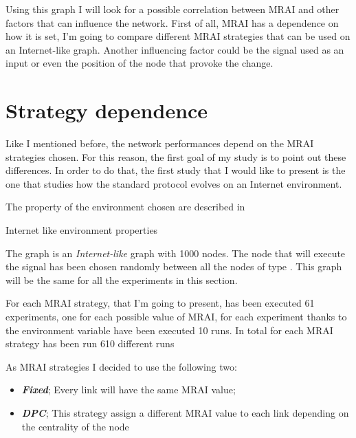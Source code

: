 Using this graph I will look for a possible correlation between \ac{MRAI} and other
factors that can influence the network.
First of all, \ac{MRAI} has a dependence on how it is set, I'm going to compare
different \ac{MRAI} strategies that can be used on an Internet-like graph.
Another influencing factor could be the signal used as an input or even the position 
of the node that provoke the change.

\section{Strategy dependence}
\label{sec:bgp_mrai_strategy_dependance}

Like I mentioned before, the network performances depend on the \ac{MRAI} strategies
chosen.
For this reason, the first goal of my study is to point out these differences.
In order to do that, the first study that I would like to present is the one
that studies how the standard protocol evolves on an Internet environment.

The property of the environment chosen are described in 

\begin{table}[h]
	
	\caption{Internet like environment properties}
	\label{tbl:internet_like_properties}
\end{table}

The graph is an \textit{Internet-like} graph with \num{1000} nodes.
The node that will execute the signal has been chosen randomly between 
all the nodes of type .
This graph will be the same for all the experiments in this section.

For each \ac{MRAI} strategy, that I'm going to present, has been executed \num{61}
experiments, one for each possible value of \ac{MRAI}, for each experiment
thanks to the environment variable have been executed \num{10} runs.
In total for each \ac{MRAI} strategy has been run \num{610} different runs

As \ac{MRAI} strategies I decided to use the following two:
\begin{itemize}
	\item \textbf{\textit{Fixed}}; Every link will have the same
		\ac{MRAI} value;
	\item \textbf{\textit{DPC}}; This strategy assign a different 
		\ac{MRAI} value to each link depending on the centrality of the node \cite{milani2020improving}
\end{itemize}


